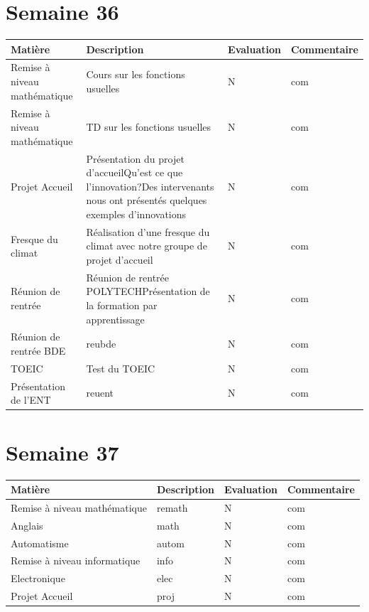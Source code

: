 \documentclass[12pt, openany]{report}
\begin{document}
\section*{Semaine 36}
\begin{tabular}{|l|l|l|l|}
\hline
Matière & Description & Evaluation & Commentaire \\ 
\hline
Remise à niveau mathématique & Cours sur les fonctions usuelles & N & com \\ 
\hline
Remise à niveau mathématique & TD sur les fonctions usuelles & N & com \\ 
\hline
Projet Accueil & Présentation du projet d'accueilQu'est ce que l'innovation?Des intervenants nous ont présentés quelques exemples d'innovations & N & com \\ 
\hline
Fresque du climat & Réalisation d'une fresque du climat avec notre groupe de projet d'accueil & N & com \\ 
\hline
Réunion de rentrée  & Réunion de rentrée POLYTECHPrésentation de la formation par apprentissage & N & com \\ 
\hline
Réunion de rentrée BDE & reubde & N & com \\ 
\hline
TOEIC & Test du TOEIC & N & com \\ 
\hline
Présentation de l'ENT & reuent & N & com \\ 
\hline
\end{tabular}

\section*{Semaine 37}
\begin{tabular}{|l|l|l|l|}
\hline
Matière & Description & Evaluation & Commentaire \\ 
\hline
Remise à niveau mathématique & remath & N & com \\ 
\hline
Anglais & math & N & com \\ 
\hline
Automatisme & autom & N & com \\ 
\hline
Remise à niveau informatique & info & N & com \\ 
\hline
Electronique & elec & N & com \\ 
\hline
Projet Accueil & proj & N & com \\ 
\hline
\end{tabular}
\end{document}
